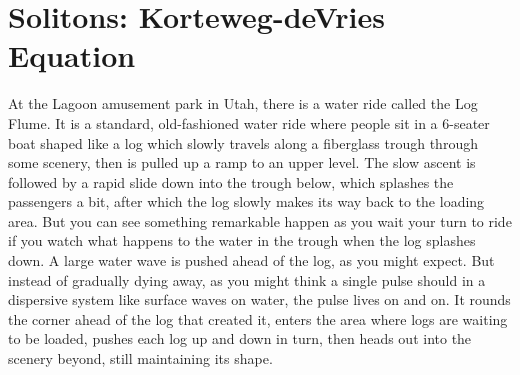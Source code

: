 \documentclass{book}
\theoremstyle{plain}
\theoremstyle{definition}
\numberwithin{exm}{chapter}
\theoremstyle{remark}
\theoremstyle{summary}
\theoremstyle{overview}
\begin{document}
\chapter*{Solitons: Korteweg-deVries Equation}
At the Lagoon amusement park in Utah, there is a water ride called the Log Flume. It is a standard, old-fashioned water ride where people sit in a 6-seater boat shaped like a log which slowly travels along a fiberglass trough through some scenery, then is pulled up a ramp to an upper level. The slow ascent is followed by a rapid slide down into the trough below, which splashes the passengers a bit, after which the log slowly makes its way back to the loading area. But you can see something remarkable happen as you wait your turn to ride if you watch what happens to the water in the trough when the log splashes down. A large water wave is pushed ahead of the log, as you might expect. But instead of gradually dying away, as you might think a single pulse should in a dispersive system like surface waves on water, the pulse lives on and on. It rounds the corner ahead of the log that created it, enters the area where logs are waiting to be loaded, pushes each log up and down in turn, then heads out into the scenery beyond, still maintaining its shape.
\end{document}
